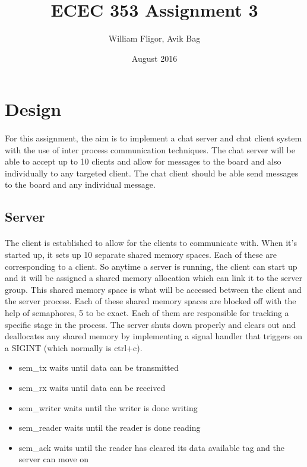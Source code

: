 \documentclass{article}
\title{ECEC 353 Assignment 3}
\author{William Fligor, Avik Bag}
\date{August 2016}
\begin{document}
\maketitle

\section{Design}

\paragraph{}
For this assignment, the aim is to implement a chat server and chat client system with the use of inter process communication techniques. The chat server will be able to accept up to 10 clients and allow for messages to the board and also individually to any targeted client. The chat client should be able send messages to the board and any individual message. 

\subsection{Server}

\paragraph{}
The client is established to allow for the clients to communicate with. When it's started up, it sets up 10 separate shared memory spaces. Each of these are corresponding to a client. So anytime a server is running, the client can start up and it will be assigned a shared memory allocation which can link it to the server group. This shared memory space is what will be accessed between the client and the server process. Each of these shared memory spaces are blocked off with the help of semaphores, 5 to be exact. Each of them are responsible for tracking a specific stage in the process. The server shuts down properly and clears out and deallocates any shared memory by implementing a signal handler that triggers on a SIGINT (which normally is ctrl+c). 

\begin{itemize}
    \item sem\_tx waits until data can be transmitted 
    \item sem\_rx waits until data can be received
    \item sem\_writer waits until the writer is done writing
    \item sem\_reader waits until the reader is done reading
    \item sem\_ack waits until the reader has cleared its data available tag and the server can move on 
\end{itemize}
\end{document}
